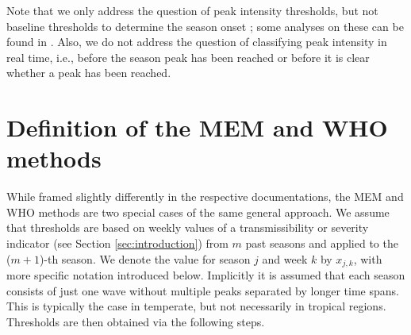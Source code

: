 \documentclass[12pt]{article}
\begin{document}
\noindent  %
Note that we only address the question of peak intensity thresholds, but not baseline thresholds to determine the season onset \citep{Vega2013}; some analyses on these can be found in \cite{Pang2023}. Also, we do not address the question of classifying peak intensity in real time, i.e., before the season peak has been reached or before it is clear whether a peak has been reached. %


\section{Definition of the MEM and WHO methods}
\label{sec:definitions}

While framed slightly differently in the respective documentations, the MEM and WHO methods are two special cases of the same general approach. We assume that thresholds are based on weekly values of a transmissibility or severity indicator (see Section \ref{sec:introduction}) from $m$ past seasons and applied to the ($m + 1$)-th season.  We denote the value for season $j$ and week $k$ by $x_{j, k}$, with more specific notation introduced below. Implicitly it is assumed that each season consists of just one wave without multiple peaks separated by longer time spans. This is typically the case in temperate, but not necessarily in tropical regions. Thresholds are then obtained via the following steps.
\end{document}
